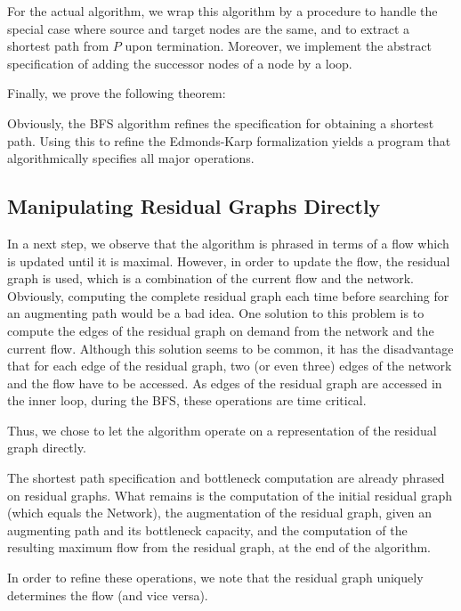 \documentclass{llncs}
\begin{document}
  For the actual algorithm, we wrap this algorithm by a procedure to handle the special case where source and target nodes are the same, and to extract a shortest path 
  from $P$ upon termination. Moreover, we implement the abstract specification of adding the successor nodes of a node by a loop.
  
  Finally, we prove the following theorem: %
  
  Obviously, the BFS algorithm refines the specification for obtaining a shortest path.
  Using this to refine the Edmonds-Karp formalization yields a program that algorithmically specifies all major operations.
    
  \subsection{Manipulating Residual Graphs Directly}    
  In a next step, we observe that the algorithm is phrased in terms of a flow which is updated until it is maximal. However,
  in order to update the flow, the residual graph is used, which is a combination of the current flow and the network.
  Obviously, computing the complete residual graph each time before searching for an augmenting path would be a bad idea. 
  One solution to this problem is to compute the edges of the residual graph on demand from the network and the current flow.
  Although this solution seems to be common, it has the disadvantage that for each edge of the residual graph, two (or even three) 
  edges of the network and the flow have to be accessed. As edges of the residual graph are accessed in the inner loop, during 
  the BFS, these operations are time critical.
  
  Thus, we chose to let the algorithm operate on a representation of the residual graph directly.
  
  The shortest path specification and bottleneck computation are already 
  phrased on residual graphs. What remains is the computation of the initial residual graph (which equals the Network),
  the augmentation of the residual graph, given an augmenting path and its bottleneck capacity, and the computation of the 
  resulting maximum flow from the residual graph, at the end of the algorithm.
  
  In order to refine these operations, we note that the residual graph uniquely determines the flow (and vice versa). 
\end{document}
